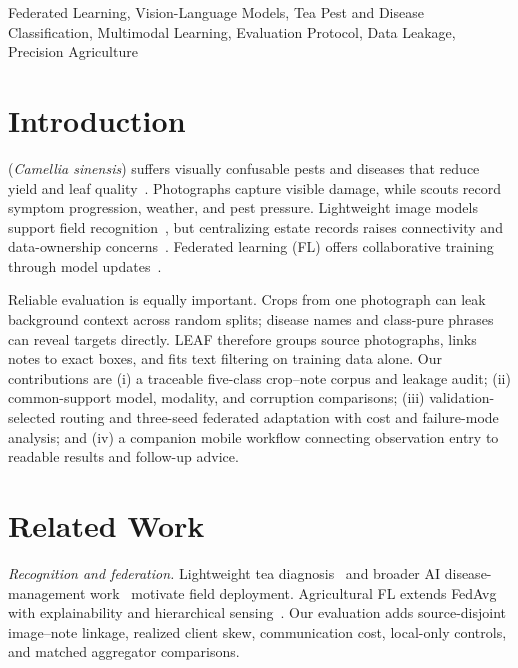 \documentclass[conference]{IEEEtran}
\begin{document}
\begin{IEEEkeywords}
Federated Learning, Vision-Language Models, Tea Pest and Disease Classification,
Multimodal Learning, Evaluation Protocol, Data Leakage, Precision Agriculture
\end{IEEEkeywords}

\section{Introduction}

 (\textit{Camellia sinensis}) suffers visually confusable
pests and diseases that reduce yield and leaf quality~\cite{Pandey2021TeaFungal}.
Photographs capture visible damage, while scouts record symptom progression,
weather, and pest pressure. Lightweight image models support field
recognition~\cite{Yang2025WaveLite}, but centralizing estate records raises
connectivity and data-ownership concerns~\cite{Dembani2025FLPrivacy}.
Federated learning (FL) offers collaborative training through model
updates~\cite{McMahan2017}.

Reliable evaluation is equally important. Crops from one photograph can leak
background context across random splits; disease names and class-pure phrases
can reveal targets directly. LEAF therefore groups source photographs, links
notes to exact boxes, and fits text filtering on training data alone.
Our contributions are (i) a traceable five-class crop--note corpus and leakage
audit; (ii) common-support model, modality, and corruption comparisons;
(iii) validation-selected routing and three-seed federated adaptation with
cost and failure-mode analysis; and (iv) a companion mobile workflow connecting
observation entry to readable results and follow-up advice.

\section{Related Work}
\label{sec:related}

\emph{Recognition and federation.} Lightweight tea diagnosis~\cite{Yang2025WaveLite}
and broader AI disease-management work~\cite{Hu2024CropProtection} motivate
field deployment. Agricultural FL extends FedAvg with explainability and
hierarchical sensing~\cite{Tahir2025FedXAI,Devaraj2024RuralAI}. Our evaluation
adds source-disjoint image--note linkage, realized client skew, communication
cost, local-only controls, and matched aggregator comparisons.
\end{document}
